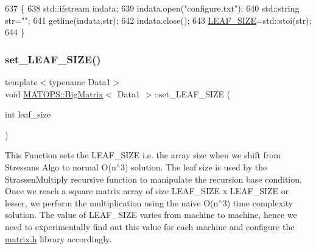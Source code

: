 \begin{DoxyCode}
637                 \{
638                         std::ifstream indata;
639                         indata.open(\textcolor{stringliteral}{"configure.txt"});
640                         std::string str=\textcolor{stringliteral}{""};
641                         getline(indata,str);
642                         indata.close();
643                         \hyperlink{classMATOPS_1_1BigMatrix_a3e8820058e3950e17136fd656b97de54}{LEAF\_SIZE}=std::stoi(str);
644                 \}
\end{DoxyCode}
\mbox{\label{classMATOPS_1_1BigMatrix_a654c6a62d3dec6a4728e56dd361adbf3}} 
\subsubsection{\texorpdfstring{set\+\_\+\+L\+E\+A\+F\+\_\+\+S\+I\+Z\+E()}{set\_LEAF\_SIZE()}}
{\footnotesize\ttfamily template$<$typename Data1$>$ \\
void \hyperlink{classMATOPS_1_1BigMatrix}{M\+A\+T\+O\+P\+S\+::\+Big\+Matrix}$<$ Data1 $>$\+::set\+\_\+\+L\+E\+A\+F\+\_\+\+S\+I\+ZE (\begin{DoxyParamCaption}\item[{int}]{leaf\+\_\+size }\end{DoxyParamCaption})\hspace{0.3cm}{\ttfamily [inline]}}



This Function sets the L\+E\+A\+F\+\_\+\+S\+I\+ZE i.\+e. the array size when we shift from Stressan\textquotesingle{}s Algo to normal O(n$^\wedge$3) solution. The leaf size is used by the Strassen\+Multiply recursive function to manipulate the recursion base condition. Once we reach a square matrix array of size L\+E\+A\+F\+\_\+\+S\+I\+ZE x L\+E\+A\+F\+\_\+\+S\+I\+ZE or lesser, we perform the multiplication using the naive O(n$^\wedge$3) time complexity solution. The value of L\+E\+A\+F\+\_\+\+S\+I\+ZE varies from machine to machine, hence we need to experimentally find out this value for each machine and configure the \hyperlink{matrix_8h}{matrix.\+h} library accordingly. 

